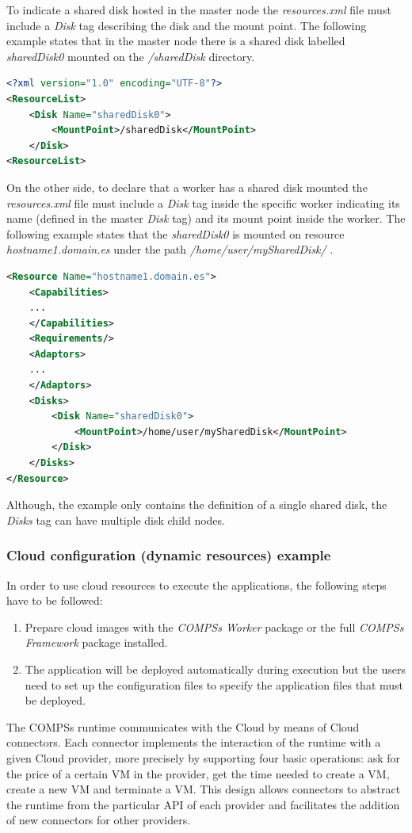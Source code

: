 To indicate a shared disk hosted in the master node the \textit{resources.xml} file must include a \textit{Disk} tag describing
the disk and the mount point. The following example states that in the master node there is a shared disk labelled 
\textit{sharedDisk0} mounted on the \textit{/sharedDisk} directory.
\begin{lstlisting}[language=xml]
<?xml version="1.0" encoding="UTF-8"?>
<ResourceList>
    <Disk Name="sharedDisk0">
        <MountPoint>/sharedDisk</MountPoint>
    </Disk>
<ResourceList>
\end{lstlisting}

On the other side, to declare that a worker has a shared disk mounted the \textit{resources.xml} file must include a \textit{Disk}
tag inside the specific worker indicating its name (defined in the master \textit{Disk} tag) and its mount point inside the worker.
The following example states that the \textit{sharedDisk0} is mounted on resource \textit{hostname1.domain.es} under the path
\textit{/home/user/mySharedDisk/} .
\begin{lstlisting}[language=xml]
<Resource Name="hostname1.domain.es">
    <Capabilities>
    ...
    </Capabilities>
    <Requirements/>
    <Adaptors>
    ...
    </Adaptors>
    <Disks>
        <Disk Name="sharedDisk0">
            <MountPoint>/home/user/mySharedDisk</MountPoint>
        </Disk>
    </Disks>
</Resource>
\end{lstlisting}

Although, the example only contains the definition of a single shared disk, the \textit{Disks} tag can have multiple 
disk child nodes.


\subsubsection{Cloud configuration (dynamic resources) example}
In order to use cloud resources to execute the applications, the following steps have to be followed:
\begin{enumerate}
 \item Prepare cloud images with the \textit{COMPSs Worker} package or the full \textit{COMPSs Framework} package installed.
 \item The application will be deployed automatically during execution but the users need to set up the configuration files to
 specify the application files that must be deployed. 
\end{enumerate}

The COMPSs runtime communicates with the Cloud by means of Cloud connectors. Each connector implements 
the interaction of the runtime with a given Cloud provider, more precisely by supporting four basic 
operations: ask for the price of a certain VM in the provider, get the time needed to create a VM, 
create a new VM and terminate a VM. This design allows connectors to abstract the runtime from the particular API
of each provider and facilitates the addition of new connectors for other providers.

